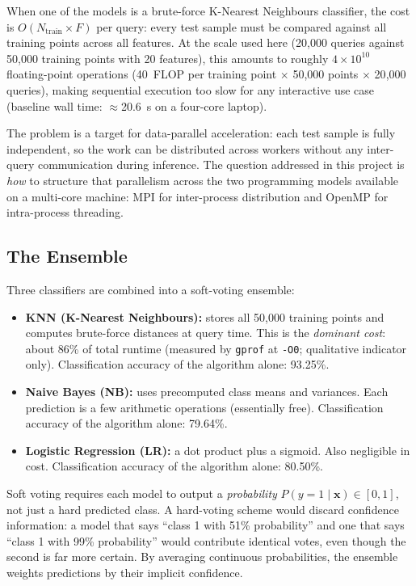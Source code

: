 \documentclass[12pt,a4paper]{article}
\begin{document}
When one of the models is a brute-force K-Nearest Neighbours
classifier, the cost is $O(N_\text{train} \times F)$ per query: every test
sample must be compared against all training points across all features.
At the scale used here (20{,}000 queries against 50{,}000 training points
with 20 features), this amounts to roughly $4 \times 10^{10}$ floating-point
operations (40~FLOP per training point $\times$ 50{,}000 points $\times$
20{,}000 queries), making sequential execution too slow for any interactive
use case (baseline wall time: $\approx$20.6~s on a four-core laptop).

The problem is a target for data-parallel acceleration: each test
sample is fully independent, so the work can be distributed across workers
without any inter-query communication during inference.
The question addressed in this project is \emph{how} to structure that
parallelism across the two programming models available on a
multi-core machine: MPI for inter-process distribution and OpenMP for
intra-process threading.

\subsection{The Ensemble}

Three classifiers are combined into a soft-voting ensemble:

\begin{itemize}
  \item \textbf{KNN (K-Nearest Neighbours):} stores all 50{,}000 training
        points and computes brute-force distances at query time.
        This is the \emph{dominant cost}: about 86\% of total runtime
        (measured by \texttt{gprof} at \texttt{-O0}; qualitative indicator only).
        Classification accuracy of the algorithm alone: 93.25\%.
  \item \textbf{Naive Bayes (NB):} uses precomputed class means and variances.
        Each prediction is a few arithmetic operations (essentially free).
        Classification accuracy of the algorithm alone: 79.64\%.
  \item \textbf{Logistic Regression (LR):} a dot product plus a sigmoid.
        Also negligible in cost.
        Classification accuracy of the algorithm alone: 80.50\%.
\end{itemize}

Soft voting requires each model to output a \emph{probability}
$P(y{=}1 \mid \mathbf{x}) \in [0,1]$, not just a hard predicted class.
A hard-voting scheme would discard confidence information: a model that
says ``class 1 with 51\% probability'' and one that says ``class 1 with
99\% probability'' would contribute identical votes, even though the
second is far more certain. By averaging continuous probabilities, the
ensemble weights predictions by their implicit confidence.
\end{document}
